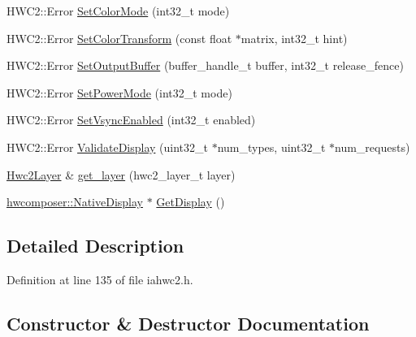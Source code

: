 \begin{DoxyCompactItemize}
\item 
H\+W\+C2\+::\+Error \mbox{\hyperlink{classandroid_1_1IAHWC2_1_1HwcDisplay_a991fb4d388962047ffacf245632dcff6}{Set\+Color\+Mode}} (int32\+\_\+t mode)
\item 
H\+W\+C2\+::\+Error \mbox{\hyperlink{classandroid_1_1IAHWC2_1_1HwcDisplay_a4656f7766ace6c2b088f95baf9890e78}{Set\+Color\+Transform}} (const float $\ast$matrix, int32\+\_\+t hint)
\item 
H\+W\+C2\+::\+Error \mbox{\hyperlink{classandroid_1_1IAHWC2_1_1HwcDisplay_a6c583df41684be8b95a614f93cbf32f3}{Set\+Output\+Buffer}} (buffer\+\_\+handle\+\_\+t buffer, int32\+\_\+t release\+\_\+fence)
\item 
H\+W\+C2\+::\+Error \mbox{\hyperlink{classandroid_1_1IAHWC2_1_1HwcDisplay_a21001029de1f371883f15e0c6cca0737}{Set\+Power\+Mode}} (int32\+\_\+t mode)
\item 
H\+W\+C2\+::\+Error \mbox{\hyperlink{classandroid_1_1IAHWC2_1_1HwcDisplay_ab8d230817aae3252a868cf626080b331}{Set\+Vsync\+Enabled}} (int32\+\_\+t enabled)
\item 
H\+W\+C2\+::\+Error \mbox{\hyperlink{classandroid_1_1IAHWC2_1_1HwcDisplay_ac1db2f4e2030edf976a113401d46d42a}{Validate\+Display}} (uint32\+\_\+t $\ast$num\+\_\+types, uint32\+\_\+t $\ast$num\+\_\+requests)
\item 
\mbox{\hyperlink{classandroid_1_1IAHWC2_1_1Hwc2Layer}{Hwc2\+Layer}} \& \mbox{\hyperlink{classandroid_1_1IAHWC2_1_1HwcDisplay_a6e9542b7195dfa8292dd70b2225d43bc}{get\+\_\+layer}} (hwc2\+\_\+layer\+\_\+t layer)
\item 
\mbox{\hyperlink{classhwcomposer_1_1NativeDisplay}{hwcomposer\+::\+Native\+Display}} $\ast$ \mbox{\hyperlink{classandroid_1_1IAHWC2_1_1HwcDisplay_a78b8d9cfdd2a0831798b705a16612271}{Get\+Display}} ()
\end{DoxyCompactItemize}


\subsection{Detailed Description}


Definition at line 135 of file iahwc2.\+h.



\subsection{Constructor \& Destructor Documentation}
\mbox{\label{classandroid_1_1IAHWC2_1_1HwcDisplay_ac2608957e4e981b04d89ccc25da9c460}} 
